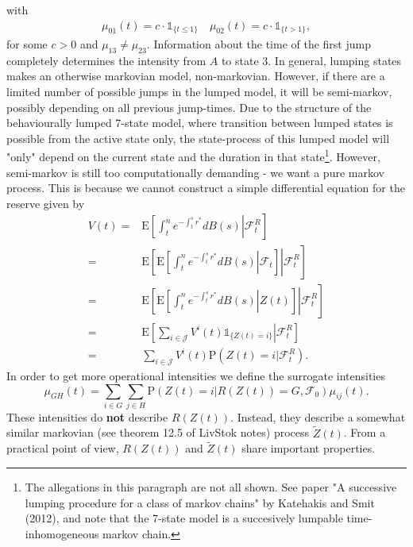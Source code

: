 \documentclass[12pt]{article}
\newcommand{\E}{\text{E}}
\newcommand{\indic}[1]{\mathds{1}_{ \{ #1 \} }}
\newcommand{\noin}{\noindent}
\renewcommand{\P}{\text{P}}
\theoremstyle{my_thm}
\theoremstyle{my_def}
\theoremstyle{my_thm2}
\begin{document}
\noin with 
\begin{gather*}
\mu_{01}(t)=c \cdot \indic{t \leq 1} \quad \mu_{02}(t)=c \cdot  \indic{t > 1},
\end{gather*}
for some $c>0$ and $\mu_{13}\neq \mu_{23}$. Information about the time of the first jump completely determines the intensity from $A$ to state 3. In general, lumping states makes an otherwise markovian model, non-markovian. However, if there are a limited number of possible jumps in the lumped model, it will be semi-markov, possibly depending on all previous jump-times. Due to the structure of the behaviourally lumped 7-state model, where transition between lumped states is possible from the active state only, the state-process of this lumped model will "only" depend on the current state and the duration in that state\footnote{The allegations in this paragraph are not all shown. See paper "A successive lumping procedure for a class of markov chains" by Katehakis and Smit (2012), and note that the 7-state model is a succesively lumpable time-inhomogeneous markov chain.}. However, semi-markov is still too computationally demanding - we want a pure markov process. This is because we cannot construct a simple differential equation for the reserve given by
\begin{align*}
V(t)=& \E \left. \left[ \int_t^n e^{-\int_t^sr^*} dB(s) \right| \mathcal{F}_t^R \right]
\\
=& \E \left.\left[ \E \left.  \left[ \int_t^n e^{-\int_t^sr^*} dB(s) \right| \mathcal{F}_t \right] \right| \mathcal{F}_t^R \right]
\\
=& \E \left.\left[ \E \left.  \left[ \int_t^n e^{-\int_t^sr^*} dB(s) \right| Z(t) \right] \right| \mathcal{F}_t^R \right]
\\
=& \E \left.\left[  \sum_{i \in \mathcal{J}} V^i(t) \indic{Z(t)=i} \right| \mathcal{F}_t^R \right]
\\
=&  \sum_{i \in \mathcal{J}} V^i(t) \P(Z(t)=i| \mathcal{F}_t^R).
\end{align*}
In order to get more operational intensities we define the surrogate intensities
$$
\mu_{GH}(t)=\sum_{i \in G}\sum_{j \in H} \P(Z(t)=i |R(Z(t)) = G, \mathcal{F}_0) \mu_{ij}(t).
$$
These intensities do \textbf{not} describe $R(Z(t))$. Instead, they describe a somewhat similar markovian (see theorem 12.5 of LivStok notes) process $\tilde{Z}(t)$. From a practical point of view, $R(Z(t))$ and $\tilde{Z}(t)$ share important properties. 
\end{document}
